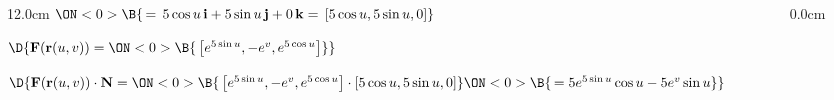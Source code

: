 \begin{frame}
\begin{columns}
\begin{column}{12.0cm}
\hspace{3.65cm} $\ON<0>{\B{\, = \, 5\cos u \,{\bf i} + 5\sin u\,{\bf j} + 0\,{\bf k} = \, [5\cos u,5\sin u,0]}}$

\vspace{0.4cm}

$\D{{\bf F}({\bf r}(u,v)) = 
\ON<0>{\B{\,\left[e^{5\sin u}, -e^{v}, e^{5\cos u}\right]}}}$

\vspace{0.3cm}

$\D{{\bf F}({\bf r}(u,v)) \cdot {\bf N} = 
\ON<0>{\B{\,\left[e^{5\sin u}, -e^{v}, e^{5\cos u}\right] \cdot [5\cos u,5\sin u,0]}}
\ON<0>{\B{\, = 5e^{5\sin u}\cos u - 5e^v\sin u}}}$

\vspace{2.8cm}

	
\end{column}\begin{column}{0.0cm}\end{column}\end{columns}
\end{frame}

